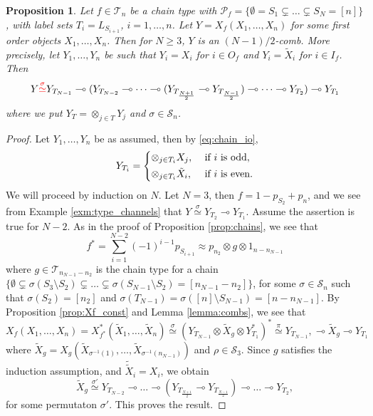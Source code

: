 \documentclass[12pt]{article}
\newtheorem{prop}{Proposition}
\theoremstyle{definition}
\theoremstyle{remark}
\def\Te{\mathcal T}
\def\Pe{\mathcal P}
\def\permut{\mathscr{S}}
\begin{document}
\begin{prop}\label{prop:chains_combs}  Let $f\in \Te_n$ be a chain type with
$\Pe_f=\{\emptyset=S_1\subsetneq\dots \subsetneq S_N=[n]\}$, with
label sets  $T_i=L_{S_{i+1}}$,  $i=1,\dots,n$.  Let $Y=X_f(X_1,\dots,X_n)$ for some first order objects $X_1,\dots, X_n$. 
Then for $N\ge 3$, $Y$ is an $(N-1)/2$-comb. 
More precisely, let $Y_1,\dots, Y_n$ be such that $Y_i=X_i$ for $i\in O_f$ and $Y_i=\tilde X_i$ for $i\in I_f$.
Then
\[
Y{\color{red}\overset{\sigma}{\simeq}}
Y_{T_{N-1}}\multimap (Y_{T_{N-2}}\multimap\dots \multimap (Y_{T_{\frac{N+1}2}}\multimap
Y_{T_{\frac{N-1}2}})\multimap\dots\multimap Y_{T_2})\multimap Y_{T_1} 
 \]
 where we put $Y_T=\otimes_{j\in T} Y_j$ and $\sigma\in \permut_n$.

\end{prop}



\begin{proof} Let $Y_1,\dots,Y_n$ be as assumed, then  by \eqref{eq:chain_io}, 
\[
Y_{T_i}=\begin{dcases} \otimes_{j\in T_i}X_j,  & \text{ if } i\text{ is odd},\\
\otimes_{j\in T_i}\tilde X_i,& \text{ if }i\text{ is even}.
\end{dcases}
\]
We will proceed by induction on $N$.
Let $N=3$, then $f=1-p_{S_2}+p_{n}$, and we see from Example \ref{exm:type_channels}
that  $Y\overset{\sigma}{\simeq} Y_{T_2}\multimap  Y_{T_1}$. 
Assume the assertion is true for  $N-2$.  As in the proof of Proposition \ref{prop:chains}, we see that 
\[
f^*=\sum_{i=1}^{N-2}(-1)^{i-1}p_{S_{i+1}}\approx p_{n_2}\otimes g\otimes 1_{n-n_{N-1}}
\]
where $g\in \Te_{n_{N-1}-n_2}$ is the chain type for  a chain $\{\emptyset\subsetneq
\sigma(S_3\setminus S_2)\subsetneq \dots\subsetneq \sigma(S_{N-1}\setminus
S_{2})=[n_{N-1}-n_2]\}$, for some $\sigma\in \permut_n$ such that $\sigma(S_2)=[n_2]$
and $\sigma(T_{N-1})=\sigma([n]\setminus S_{N-1})=[n-n_{N-1}]$. 
 By Proposition \ref{prop:Xf_const} and Lemma \ref{lemma:combs}, we see that 
\[
X_f(X_1,\dots,X_n)=X_{f^*}^*(\tilde X_1,\dots, \tilde X_n)\overset{\sigma}\simeq (Y_{T_{N-1}}\otimes
\tilde X_g\otimes Y^*_{T_1})^*\overset{\pi}{\simeq} Y_{T_{N-1}},\multimap \tilde
X_g\multimap Y_{T_1}
\]
where $\tilde X_g=X_g(\tilde X_{\sigma^{-1}(1)},\dots, \tilde X_{\sigma^{-1}(n_{N-1})})$
and $\rho\in \permut_3$. Since $g$ satisfies the induction assumption, and $\tilde {\tilde
X}_i=X_i$, we obtain 
\[
\tilde X_g\overset{\sigma'}{\simeq}
Y_{T_{N-2}}\multimap \dots\multimap (Y_{T_{\frac{N+1}2}}\multimap
Y_{T_{\frac{N-1}2}})\multimap \dots \multimap Y_{T_2},
\]
for some permutaton $\sigma'$. This proves the result.


\end{proof}
\end{document}
